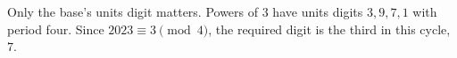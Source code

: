 Only the base's units digit matters. Powers of $3$ have units digits $3,9,7,1$ with period four. Since $2023\equiv3\pmod4$, the required digit is the third in this cycle, $\boxed7$.
